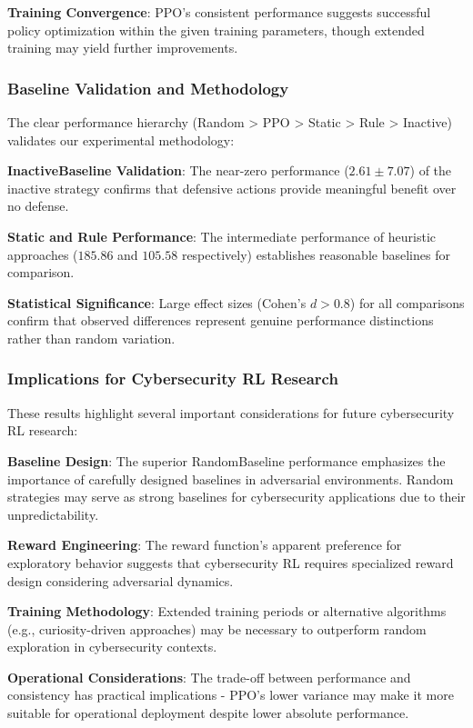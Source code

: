 \documentclass[12pt,twoside]{article}
\theoremstyle{definition}
\theoremstyle{plain}
\begin{document}
\textbf{Training Convergence}: PPO's consistent performance suggests successful policy optimization within the given training parameters, though extended training may yield further improvements.

\subsubsection{Baseline Validation and Methodology}

The clear performance hierarchy (Random > PPO > Static > Rule > Inactive) validates our experimental methodology:

\textbf{InactiveBaseline Validation}: The near-zero performance ($2.61 \pm 7.07$) of the inactive strategy confirms that defensive actions provide meaningful benefit over no defense.

\textbf{Static and Rule Performance}: The intermediate performance of heuristic approaches ($185.86$ and $105.58$ respectively) establishes reasonable baselines for comparison.

\textbf{Statistical Significance}: Large effect sizes (Cohen's $d > 0.8$) for all comparisons confirm that observed differences represent genuine performance distinctions rather than random variation.

\subsubsection{Implications for Cybersecurity RL Research}

These results highlight several important considerations for future cybersecurity RL research:

\textbf{Baseline Design}: The superior RandomBaseline performance emphasizes the importance of carefully designed baselines in adversarial environments. Random strategies may serve as strong baselines for cybersecurity applications due to their unpredictability.

\textbf{Reward Engineering}: The reward function's apparent preference for exploratory behavior suggests that cybersecurity RL requires specialized reward design considering adversarial dynamics.

\textbf{Training Methodology}: Extended training periods or alternative algorithms (e.g., curiosity-driven approaches) may be necessary to outperform random exploration in cybersecurity contexts.

\textbf{Operational Considerations}: The trade-off between performance and consistency has practical implications - PPO's lower variance may make it more suitable for operational deployment despite lower absolute performance.
\end{document}
